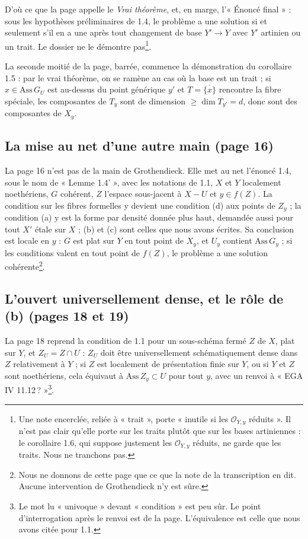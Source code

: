 \documentclass[11pt,a4paper]{article}
\begin{document}
D'où ce que la page appelle le \emph{Vrai théorème}, et, en marge, l'«
Énoncé final » : sous les hypothèses préliminaires de 1.4, le problème a une
solution si et seulement s'il en a une après tout changement de base
$Y' \to Y$ avec $Y'$ artinien ou un trait.
Le dossier ne le démontre pas\footnote{Une note encerclée, reliée à « trait »,
porte « inutile si les $\mathcal{O}_{Y,y}$ réduits ». Il n'est pas clair
qu'elle porte sur les traits plutôt que sur les bases artiniennes : le
corollaire 1.6, qui suppose justement les $\mathcal{O}_{Y,y}$ réduits, ne garde
que les traits. Nous ne tranchons pas.}.

La seconde moitié de la page, barrée, commence la démonstration du
corollaire 1.5 : par le vrai théorème, on se ramène au cas où la base est un
trait ; si $x \in \mathrm{Ass}\, G_U$ est au-dessus du point générique $y'$ et
$T = \overline{\{x\}}$ rencontre la fibre spéciale, les composantes de
$T_y$ sont de dimension $\geqslant \dim T_{y'} = d$, donc sont des
composantes de $X_y$.

\subsection*{La mise au net d'une autre main (page 16)}

La page 16 n'est pas de la main de Grothendieck. Elle met au net l'énoncé
1.4, sous le nom de « Lemme 1.4' », avec les notations de 1.1, $X$ et $Y$
localement noethériens, $G$ cohérent, $Z$ l'espace sous-jacent à $X - U$ et
$y \in f(Z)$. La condition sur les fibres formelles y devient une condition
(d) aux points de $Z_y$ ; la condition (a) y est la forme par densité donnée
plus haut, demandée aussi pour tout $X'$ étale sur $X$ ; (b) et (c) sont
celles que nous avons écrites. Sa conclusion est locale en $y$ : $G$ est plat
sur $Y$ en tout point de $X_y$, et $U_y$ contient $\mathrm{Ass}\, G_y$ ; si les
conditions valent en tout point de $f(Z)$, le problème a une solution
cohérente\footnote{Nous ne donnons de cette page que ce que la note de la
transcription en dit. Aucune intervention de Grothendieck n'y est sûre.}.

\subsection*{L'ouvert universellement dense, et le rôle de (b) (pages 18 et 19)}

La page 18 reprend la condition de 1.1 pour un sous-schéma fermé $Z$ de
$X$, plat sur $Y$, et $Z_U = Z \cap U$ : $Z_U$ doit être universellement
schématiquement dense dans $Z$ relativement à $Y$ ; si $Z$ est localement de
présentation finie sur $Y$, ou si $Y$ et $Z$ sont noethériens, cela équivaut à
$\mathrm{Ass}\, Z_y \subset U$ pour tout $y$, avec un renvoi à « EGA IV
11.12\,? »\footnote{Le mot lu « univoque » devant « condition » est peu sûr. Le
point d'interrogation après le renvoi est de la page. L'équivalence est celle
que nous avons citée pour 1.1.}.
\end{document}
